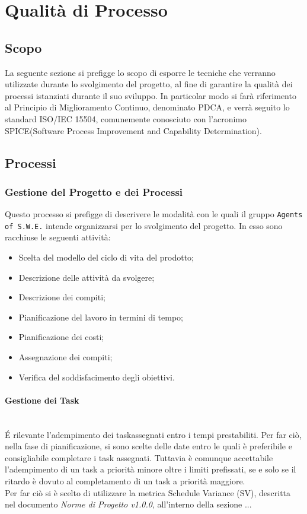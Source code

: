 \section{Qualità di Processo}
\label{qualitaProcesso}

\subsection{Scopo}

La seguente sezione si prefigge lo scopo di esporre le tecniche che verranno utilizzate durante lo svolgimento del progetto, al fine di garantire la qualità dei processi istanziati durante il suo sviluppo. In particolar modo si farà riferimento al Principio di Miglioramento Continuo, denominato PDCA\glossario, e verrà seguito lo standard ISO/IEC 15504, comunemente conosciuto con l'acronimo SPICE\glossario (Software Process Improvement and Capability Determination).

\subsection{Processi}
\subsubsection{Gestione del Progetto e dei Processi} 

Questo processo si prefigge di descrivere le modalità con le quali il gruppo \texttt{Agents of S.W.E.} intende organizzarsi per lo svolgimento del progetto. In esso sono racchiuse le seguenti attività:
\begin{itemize}
	\item Scelta del modello del ciclo di vita del prodotto;
	\item Descrizione delle attività da svolgere;
	\item Descrizione dei compiti;
	\item Pianificazione del lavoro in termini di tempo;
	\item Pianificazione dei costi;
	\item Assegnazione dei compiti;
	\item Verifica del soddisfacimento degli obiettivi.
\end{itemize}

\paragraph{Gestione dei Task} \-\\
\'E rilevante	 l'adempimento dei task\glossario assegnati entro i tempi prestabiliti. Per far ciò, nella fase di pianificazione, si sono scelte delle date entro le quali è preferibile e consigliabile completare i task assegnati. Tuttavia è comunque accettabile l'adempimento di un task a priorità minore oltre i limiti prefissati, se e solo se il ritardo è dovuto al completamento di un task a priorità maggiore.\\
Per far ciò si è scelto di utilizzare la metrica Schedule Variance (SV), descritta nel documento \textit{Norme di Progetto v1.0.0}, all'interno della sezione ...  

